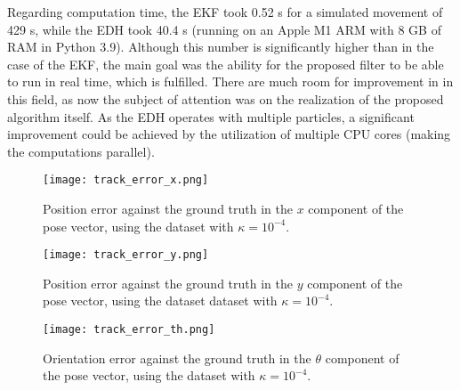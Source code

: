 Regarding computation time, the EKF took 0.52 s for a simulated movement of 429 s,
while the EDH took 40.4 s (running on an Apple M1 ARM with 8 GB of RAM
in Python 3.9).
Although this number is significantly higher
than in the case of the EKF, the main goal was the ability for the proposed
filter to be able to run in real time, which is fulfilled.
There are much room for improvement in in this field, as now the
subject of attention was on the realization of the proposed algorithm itself.
As the EDH operates with multiple particles, a significant improvement could
be achieved by the utilization of multiple CPU cores (making the computations
parallel).
\begin{figure}[htbp]
    \centering
    \texttt{[image: track\_error\_x.png]}
    \caption{Position error against the ground truth in the $x$ component of the pose vector,
        using the dataset with $\kappa = 10^{-4}$.}
    \label{fig:setup2-x-error}
\end{figure}
\begin{figure}[htbp]
    \centering
    \texttt{[image: track\_error\_y.png]}
    \caption{Position error against the ground truth in the $y$ component of the pose vector,
        using the dataset dataset with $\kappa = 10^{-4}$.}
    \label{fig:setup2-y-error}
\end{figure}
\begin{figure}[htbp]
    \centering
    \texttt{[image: track\_error\_th.png]}
    \caption{Orientation error against the ground truth in the $\theta$ component of the pose vector,
        using the  dataset with $\kappa = 10^{-4}$.}
    \label{fig:setup2-th-error}
\end{figure}
